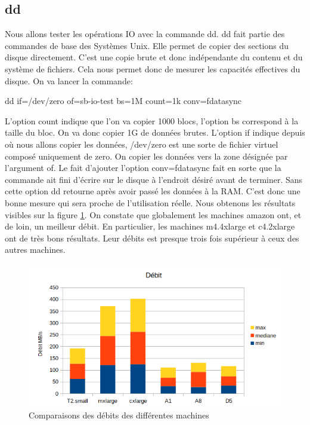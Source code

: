\documentclass[11pt]{article}
\begin{document}
\subsection{dd}
	Nous allons tester les opérations IO avec la commande dd.
	dd fait partie des commandes de base des Systèmes Unix. Elle permet
	de copier des sections du disque directement.
	C'est une copie brute et donc indépendante du contenu et du 
	système de fichiers. Cela nous permet donc de mesurer les capacités
	effectives du disque. On va lancer la commande: \\
	\begin{center}
		dd if=/dev/zero of=sb-io-test bs=1M count=1k conv=fdatasync
	\end{center}
	L'option count indique que l'on va copier 1000 blocs, l'option bs
	correspond à la taille du bloc. On va donc copier 1G de données brutes.
	L'option if indique depuis où nous allons copier les données, /dev/zero
	est une sorte de fichier virtuel composé uniquement de zero. On copier
	les données vers la zone désignée par l'argument of.
	Le fait d'ajouter l'option conv=fdatasync fait en sorte que la commande
	ait fini d'écrire sur le disque à l'endroit désiré avant de terminer.
	Sans cette option dd retourne après avoir passé les données à la RAM.
	C'est donc une bonne mesure qui sera proche de l'utilisation réelle.
	Nous obtenons les résultats visibles sur la figure \ref{fig:io}. On constate que globalement les machines amazon ont, et de loin, un meilleur débit. En particulier,
	les machines m4.4xlarge et c4.2xlarge ont de très bons résultats. Leur débits est presque trois fois supérieur à ceux des autres machines.
\begin{figure}
\centering
\includegraphics[width=0.9\linewidth]{images/IO}
\caption{Comparaisons des débits des différentes machines}
\label{fig:io}
\end{figure}
\end{document}
